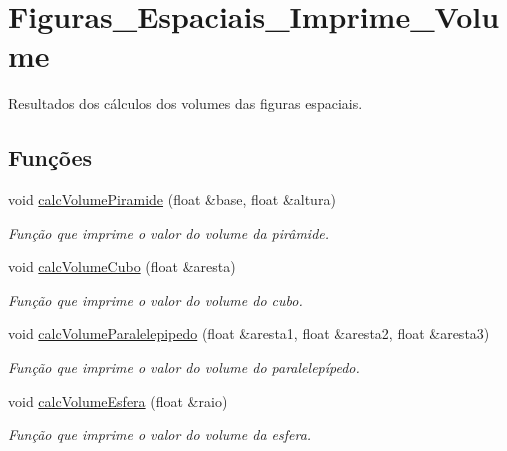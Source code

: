 \hypertarget{group__Figuras__Espaciais__Imprime__Volume}{}\section{Figuras\+\_\+\+Espaciais\+\_\+\+Imprime\+\_\+\+Volume}
\label{group__Figuras__Espaciais__Imprime__Volume}


Resultados dos cálculos dos volumes das figuras espaciais.  


\subsection*{Funções}
\begin{DoxyCompactItemize}
\item 
void \hyperlink{group__Figuras__Espaciais__Imprime__Volume_gaa5acf0ff0f4eb8061d1b86334d2838de}{calc\+Volume\+Piramide} (float \&base, float \&altura)
\begin{DoxyCompactList}\small\item\em Função que imprime o valor do volume da pirâmide. \end{DoxyCompactList}\item 
void \hyperlink{group__Figuras__Espaciais__Imprime__Volume_gaf35d29634faa808e187b6635ac6e1fb9}{calc\+Volume\+Cubo} (float \&aresta)
\begin{DoxyCompactList}\small\item\em Função que imprime o valor do volume do cubo. \end{DoxyCompactList}\item 
void \hyperlink{group__Figuras__Espaciais__Imprime__Volume_ga994d3c26012b734a4cbabf0ce0c7b75b}{calc\+Volume\+Paralelepipedo} (float \&aresta1, float \&aresta2, float \&aresta3)
\begin{DoxyCompactList}\small\item\em Função que imprime o valor do volume do paralelepípedo. \end{DoxyCompactList}\item 
void \hyperlink{group__Figuras__Espaciais__Imprime__Volume_gaddef3fdcde1a2b12007610961caffae5}{calc\+Volume\+Esfera} (float \&raio)
\begin{DoxyCompactList}\small\item\em Função que imprime o valor do volume da esfera. \end{DoxyCompactList}\end{DoxyCompactItemize}


